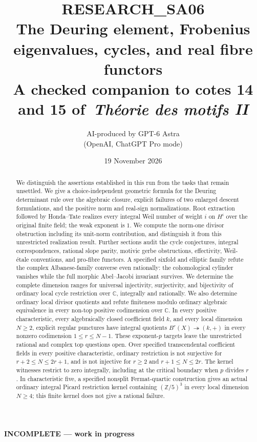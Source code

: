 \documentclass[11pt,a4paper]{article}
\title{\textbf{RESEARCH\_SA06}\\[5pt]
The Deuring element, Frobenius eigenvalues, cycles, and real fibre functors\\[5pt]
\large A checked companion to cotes 14 and 15 of\
\emph{Théorie des motifs II}}
\author{AI-produced by GPT-6 Astra\\(OpenAI, ChatGPT Pro mode)}
\date{19 November 2026}
\begin{document}
\maketitle
\begin{center}\textbf{INCOMPLETE --- work in progress}\end{center}
\begin{abstract}
We distinguish the assertions established in this run from the tasks that
remain unsettled. We give a choice-independent geometric formula for the
Deuring determinant rule over the algebraic closure, explicit failures of
two enlarged descent formulations, and the positive norm and real-sign
normalizations. Root extraction followed by Honda--Tate realizes every
integral Weil number of weight $i$ on $H^i$ over the original finite field;
the weak exponent is $1$. We compute the norm-one divisor obstruction
including its unit-norm contribution, and distinguish it from this
unrestricted realization result. Further sections audit the cycle
conjectures, integral correspondences, rational slope parity, motivic
gerbe obstructions, effectivity, Weil-étale conventions, and pro-fibre
functors. A specified sixfold and elliptic family refute the complex
Albanese-family converse even rationally: the cohomological cylinder
vanishes while the full morphic Abel--Jacobi invariant survives.
We determine the complete dimension ranges for universal injectivity,
surjectivity, and bijectivity of ordinary local cycle restriction over
$\mathbb C$, integrally and rationally. We also determine ordinary local
divisor quotients and refute finiteness modulo ordinary algebraic
equivalence in every non-top positive codimension over $\mathbb C$.
In every positive characteristic, every algebraically closed coefficient
field $k$, and every local dimension $N\ge2$, explicit regular punctures
have integral quotients $B^r(X)\twoheadrightarrow(k,+)$ in every
nonzero codimension $1\le r\le N-1$. These exponent-$p$ targets leave the
unrestricted rational and complex top questions open.
Over specified transcendental coefficient fields in every positive
characteristic, ordinary restriction is not surjective for
$r+2\le N\le2r+1$, and is not injective for $r\ge2$ and
$r+1\le N\le2r$. The kernel witnesses restrict to zero integrally,
including at the critical boundary when $p$ divides $r$.
In characteristic five, a specified nonsplit Fermat-quartic construction
gives an actual ordinary integral Picard restriction kernel containing
$(\mathbb Z/5)^3$ in every local dimension $N\ge4$; this finite kernel
does not give a rational failure.

\end{abstract}
\end{document}
